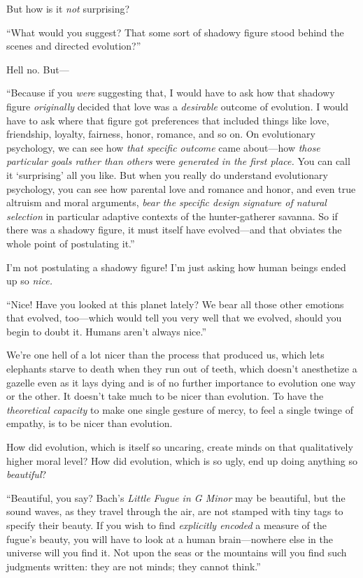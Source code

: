 {
 But how is it \textit{not} surprising?}

{
 ``What would you suggest? That some sort of
shadowy figure stood behind the scenes and directed
evolution?''}

{
 Hell no. But---}

{
 ``Because if you \textit{were} suggesting that, I
would have to ask how that shadowy figure \textit{originally} decided
that love was a \textit{desirable} outcome of evolution. I would have
to ask where that figure got preferences that included things like
love, friendship, loyalty, fairness, honor, romance, and so on. On
evolutionary psychology, we can see how \textit{that specific outcome}
came about---how \textit{those particular goals rather than others}
were \textit{generated in the first place.} You can call it
`surprising' all you like. But when you
really do understand evolutionary psychology, you can see how parental
love and romance and honor, and even true altruism and moral arguments,
\textit{bear the specific design signature of natural selection} in
particular adaptive contexts of the hunter-gatherer savanna. So if
there was a shadowy figure, it must itself have evolved---and that
obviates the whole point of postulating it.''}

{
 I'm not postulating a shadowy figure!
I'm just asking how human beings ended up so
\textit{nice.}}

{
 ``Nice! Have you looked at this planet lately? We
bear all those other emotions that evolved, too---which would tell you
very well that we evolved, should you begin to doubt it. Humans
aren't always nice.''}

{
 We're one hell of a lot nicer than the process
that produced us, which lets elephants starve to death when they run
out of teeth, which doesn't anesthetize a gazelle even
as it lays dying and is of no further importance to evolution one way
or the other. It doesn't take much to be nicer than
evolution. To have the \textit{theoretical capacity} to make one single
gesture of mercy, to feel a single twinge of empathy, is to be nicer
than evolution.}

{
 How did evolution, which is itself so uncaring, create minds on
that qualitatively higher moral level? How did evolution, which is so
ugly, end up doing anything so \textit{beautiful}?}

{
 ``Beautiful, you say? Bach's
\textit{Little Fugue in G Minor} may be beautiful, but the sound waves,
as they travel through the air, are not stamped with tiny tags to
specify their beauty. If you wish to find \textit{explicitly encoded} a
measure of the fugue's beauty, you will have to look at
a human brain---nowhere else in the universe will you find it. Not upon
the seas or the mountains will you find such judgments written: they
are not minds; they cannot think.''}

